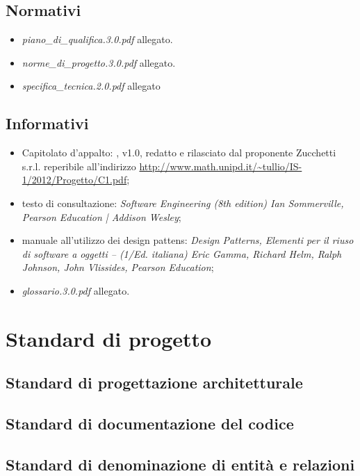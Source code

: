 \subsection{Normativi}
\begin{itemize}
\item[] \textit{piano\_di\_qualifica.3.0.pdf} allegato.
\item[] \textit{norme\_di\_progetto.3.0.pdf} allegato.
\item[] \textit{specifica\_tecnica.2.0.pdf} allegato
\end{itemize}

\subsection{Informativi}
\begin{itemize}
\item[] Capitolato d'appalto: \caName{}, v1.0, redatto e rilasciato dal proponente Zucchetti s.r.l. reperibile all'indirizzo \url{http://www.math.unipd.it/~tullio/IS-1/2012/Progetto/C1.pdf};
\item[] testo di consultazione: \textit{Software Engineering (8th edition) Ian Sommerville, Pearson Education | Addison Wesley};
\item[] manuale all'utilizzo dei design pattens: \textit{Design Patterns, Elementi per il riuso di software a oggetti -- (1/Ed. italiana) Eric Gamma, Richard Helm, Ralph Johnson, John Vlissides, Pearson Education};
\item[] \textit{glossario.3.0.pdf} allegato.
\end{itemize}
\clearpage

\section{Standard di progetto}

\subsection{Standard di progettazione architetturale}

\subsection{Standard di documentazione del codice}

\subsection{Standard di denominazione di entità e relazioni}

